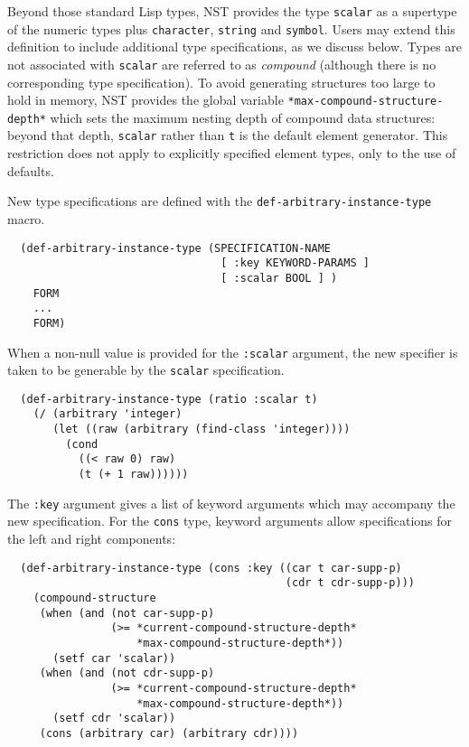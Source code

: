 Beyond those standard Lisp types, NST provides the type
\texttt{scalar} as a supertype of the numeric types plus
\texttt{character}, \texttt{string} and \texttt{symbol}.  Users may
extend this definition to include additional type specifications, as
we discuss below.  Types are not associated with \texttt{scalar} are
referred to as \emph{compound} (although there is no corresponding
type specification).  To avoid generating structures too large to hold
in memory, NST provides the global variable
\texttt{*max-compound-structure-depth*}\label{max-compound-structure-depth}
which sets the maximum nesting depth of compound data structures:
beyond that depth, \texttt{scalar} rather than \texttt{t} is the
default element generator.  This restriction does not apply to
explicitly specified element types, only to the use of defaults.

New type specifications are defined with the
\texttt{def-arbitrary-instance-type}
macro.
\label{def-arbitrary-instance-type}
\begin{verbatim}
  (def-arbitrary-instance-type (SPECIFICATION-NAME
                                 [ :key KEYWORD-PARAMS ]
                                 [ :scalar BOOL ] )
    FORM
    ...
    FORM)
\end{verbatim}
When a non-null value is provided for the \texttt{:scalar} argument,
the new specifier is taken to be generable by the \texttt{scalar}
specification.
\begin{verbatim}
  (def-arbitrary-instance-type (ratio :scalar t)
    (/ (arbitrary 'integer)
       (let ((raw (arbitrary (find-class 'integer))))
         (cond
           ((< raw 0) raw)
           (t (+ 1 raw))))))
\end{verbatim}
The \texttt{:key} argument gives a list of keyword arguments which may
accompany the new specification.  For the \texttt{cons} type, keyword
arguments allow specifications for the left and right components:
\begin{verbatim}
  (def-arbitrary-instance-type (cons :key ((car t car-supp-p)
                                           (cdr t cdr-supp-p)))
    (compound-structure
     (when (and (not car-supp-p)
                (>= *current-compound-structure-depth*
                    *max-compound-structure-depth*))
       (setf car 'scalar))
     (when (and (not cdr-supp-p)
                (>= *current-compound-structure-depth*
                    *max-compound-structure-depth*))
       (setf cdr 'scalar))
     (cons (arbitrary car) (arbitrary cdr))))
\end{verbatim}

